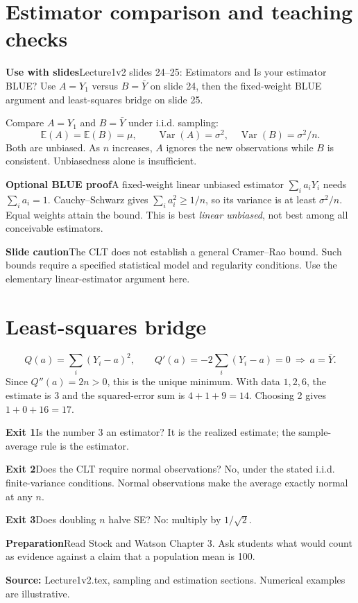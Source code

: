 \documentclass[11pt,a4paper]{article}
\newcommand{\heading}[1]{\section*{\color{accent}#1}}
\newcommand{\cue}[2]{\par\noindent\textbf{#1}\quad #2\par}
\newcommand{\E}{\mathbb{E}}
\newcommand{\Var}{\operatorname{Var}}
\begin{document}
\newpage
\heading{Estimator comparison and teaching checks}
\cue{Use with slides}{Lecture1v2 slides 24--25: Estimators and Is your estimator BLUE? Use $A=Y_1$ versus $B=\bar Y$ on slide 24, then the fixed-weight BLUE argument and least-squares bridge on slide 25.}
Compare $A=Y_1$ and $B=\bar Y$ under i.i.d. sampling:
\[
\E(A)=\E(B)=\mu,\qquad \Var(A)=\sigma^2,\quad\Var(B)=\sigma^2/n.
\]
Both are unbiased. As $n$ increases, $A$ ignores the new observations while $B$ is consistent. Unbiasedness alone is insufficient.
\cue{Optional BLUE proof}{A fixed-weight linear unbiased estimator $\sum_i a_iY_i$ needs $\sum_i a_i=1$. Cauchy--Schwarz gives $\sum_i a_i^2\geq1/n$, so its variance is at least $\sigma^2/n$. Equal weights attain the bound. This is best \emph{linear unbiased}, not best among all conceivable estimators.}
\cue{Slide caution}{The CLT does not establish a general Cramer--Rao bound. Such bounds require a specified statistical model and regularity conditions. Use the elementary linear-estimator argument here.}
\heading{Least-squares bridge}
\[
Q(a)=\sum_i(Y_i-a)^2,\qquad
Q'(a)=-2\sum_i(Y_i-a)=0\ \Rightarrow\ a=\bar Y.
\]
Since $Q''(a)=2n>0$, this is the unique minimum. With data $1,2,6$, the estimate is 3 and the squared-error sum is $4+1+9=14$. Choosing 2 gives $1+0+16=17$.
\cue{Exit 1}{Is the number 3 an estimator? It is the realized estimate; the sample-average rule is the estimator.}
\cue{Exit 2}{Does the CLT require normal observations? No, under the stated i.i.d. finite-variance conditions. Normal observations make the average exactly normal at any $n$.}
\cue{Exit 3}{Does doubling $n$ halve SE? No: multiply by $1/\sqrt2$.}
\cue{Preparation}{Read Stock and Watson Chapter 3. Ask students what would count as evidence against a claim that a population mean is 100.}
\textbf{Source:} Lecture1v2.tex, sampling and estimation sections. Numerical examples are illustrative.
\end{document}

